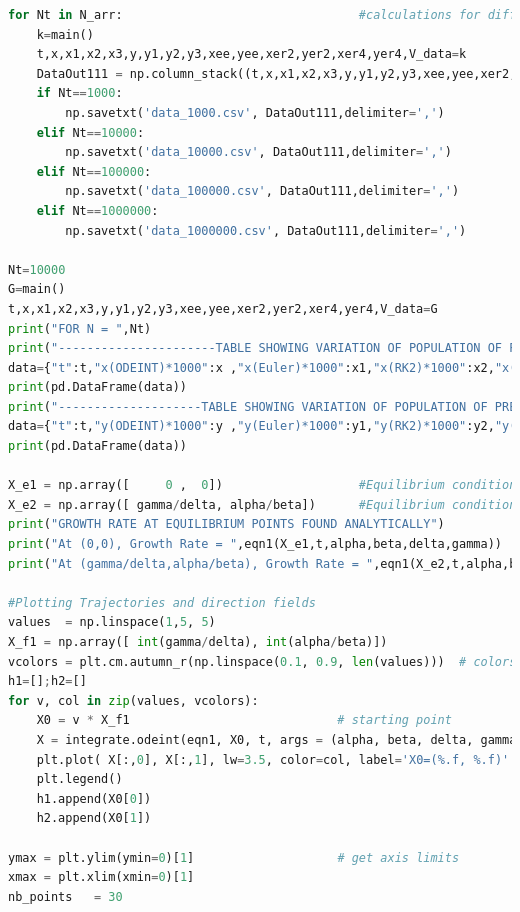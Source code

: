 \documentclass[12pt]{article}
\begin{document}
\begin{lstlisting}[language=Python, caption=Python example]
for Nt in N_arr:                                 #calculations for different N and storing values in csv files
    k=main()
    t,x,x1,x2,x3,y,y1,y2,y3,xee,yee,xer2,yer2,xer4,yer4,V_data=k
    DataOut111 = np.column_stack((t,x,x1,x2,x3,y,y1,y2,y3,xee,yee,xer2,yer2,xer4,yer4,V_data))
    if Nt==1000:
        np.savetxt('data_1000.csv', DataOut111,delimiter=',') 
    elif Nt==10000:
        np.savetxt('data_10000.csv', DataOut111,delimiter=',') 
    elif Nt==100000:
        np.savetxt('data_100000.csv', DataOut111,delimiter=',') 
    elif Nt==1000000:
        np.savetxt('data_1000000.csv', DataOut111,delimiter=',') 

Nt=10000
G=main()
t,x,x1,x2,x3,y,y1,y2,y3,xee,yee,xer2,yer2,xer4,yer4,V_data=G
print("FOR N = ",Nt)
print("----------------------TABLE SHOWING VARIATION OF POPULATION OF PREY(x) WITH TIME(t)-------------------------")
data={"t":t,"x(ODEINT)*1000":x ,"x(Euler)*1000":x1,"x(RK2)*1000":x2,"x(RK4)*1000":x3,"[x(odeint)-x(euler)]/x(odeint)":xee,"[x(odeint)-x(rk2)]/x(odeint)":xer2,"[x(odeint)-x(rk4)]/x(odeint)":xer4}
print(pd.DataFrame(data))
print("--------------------TABLE SHOWING VARIATION OF POPULATION OF PREDATOR(y) WITH TIME(t)-----------------------")
data={"t":t,"y(ODEINT)*1000":y ,"y(Euler)*1000":y1,"y(RK2)*1000":y2,"y(RK4)*1000":y3,"[y(odeint)-y(euler)]/y(odeint)":yee,"[y(odeint)-y(rk2)]/y(odeint)":yer2,"[y(odeint)-y(rk4)]/y(odeint)":yer4}
print(pd.DataFrame(data))

X_e1 = np.array([     0 ,  0])                   #Equilibrium condition 1
X_e2 = np.array([ gamma/delta, alpha/beta])      #Equilibrium condition 2                                   
print("GROWTH RATE AT EQUILIBRIUM POINTS FOUND ANALYTICALLY")
print("At (0,0), Growth Rate = ",eqn1(X_e1,t,alpha,beta,delta,gamma))
print("At (gamma/delta,alpha/beta), Growth Rate = ",eqn1(X_e2,t,alpha,beta,delta,gamma))

#Plotting Trajectories and direction fields
values  = np.linspace(1,5, 5)                          
X_f1 = np.array([ int(gamma/delta), int(alpha/beta)])
vcolors = plt.cm.autumn_r(np.linspace(0.1, 0.9, len(values)))  # colors for each trajectory
h1=[];h2=[]
for v, col in zip(values, vcolors):
    X0 = v * X_f1                             # starting point
    X = integrate.odeint(eqn1, X0, t, args = (alpha, beta, delta, gamma))     
    plt.plot( X[:,0], X[:,1], lw=3.5, color=col, label='X0=(%.f, %.f)' % ( X0[0], X0[1]) )
    plt.legend()
    h1.append(X0[0])
    h2.append(X0[1])

ymax = plt.ylim(ymin=0)[1]                    # get axis limits
xmax = plt.xlim(xmin=0)[1]
nb_points   = 30


\end{lstlisting}
\end{document}
